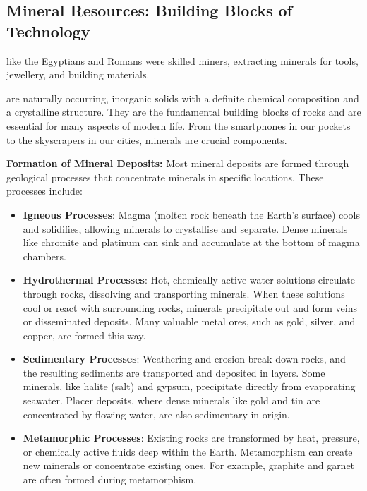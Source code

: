 \subsection{Mineral Resources: Building Blocks of Technology}

\begin{marginnote}
 like the Egyptians and Romans were skilled miners, extracting minerals for tools, jewellery, and building materials.
\end{marginnote}

 are naturally occurring, inorganic solids with a definite chemical composition and a crystalline structure. They are the fundamental building blocks of rocks and are essential for many aspects of modern life. From the smartphones in our pockets to the skyscrapers in our cities, minerals are crucial components.

\textbf{Formation of Mineral Deposits:} Most mineral deposits are formed through geological processes that concentrate minerals in specific locations. These processes include:

\begin{itemize}
    \item \textbf{Igneous Processes}: Magma (molten rock beneath the Earth's surface) cools and solidifies, allowing minerals to crystallise and separate.  Dense minerals like chromite and platinum can sink and accumulate at the bottom of magma chambers.
    \item \textbf{Hydrothermal Processes}: Hot, chemically active water solutions circulate through rocks, dissolving and transporting minerals. When these solutions cool or react with surrounding rocks, minerals precipitate out and form veins or disseminated deposits. Many valuable metal ores, such as gold, silver, and copper, are formed this way.
    \item \textbf{Sedimentary Processes}: Weathering and erosion break down rocks, and the resulting sediments are transported and deposited in layers.  Some minerals, like halite (salt) and gypsum, precipitate directly from evaporating seawater.  Placer deposits, where dense minerals like gold and tin are concentrated by flowing water, are also sedimentary in origin.
    \item \textbf{Metamorphic Processes}:  Existing rocks are transformed by heat, pressure, or chemically active fluids deep within the Earth.  Metamorphism can create new minerals or concentrate existing ones. For example, graphite and garnet are often formed during metamorphism.
\end{itemize}

